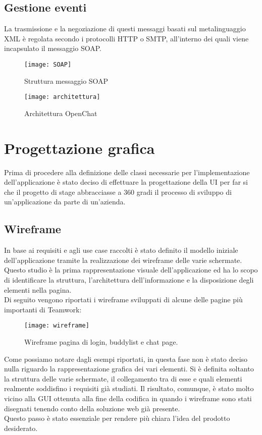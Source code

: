 \subsection{Gestione eventi}
La trasmissione e la negoziazione di questi messaggi  basati sul metalinguaggio XML è regolata secondo i protocolli HTTP o SMTP, all'interno dei quali viene incapsulato il messaggio SOAP.
\begin{figure}[H] 
	\centering
	\texttt{[image: SOAP]}
	\caption{Struttura messaggio SOAP}
\end{figure}

\begin{figure}[H] 
	\centering
	\texttt{[image: architettura]}
	\caption{Architettura OpenChat}
\end{figure}


\section{Progettazione grafica}
Prima di procedere alla definizione delle classi necessarie per l'implementazione 
dell'applicazione è stato deciso di effettuare la progettazione della UI per far 
si che il progetto di stage abbracciasse a 360 gradi il processo di sviluppo di 
un'applicazione da parte di un'azienda.

\subsection{Wireframe}
In base ai requisiti e agli use case raccolti è stato definito il modello iniziale
 dell'applicazione tramite la realizzazione dei wireframe delle varie schermate. \\
Questo studio è la prima rappresentazione visuale dell'applicazione ed ha lo 
scopo di identificare la struttura, l'architettura dell'informazione e la 
disposizione degli elementi nella pagina.\\
Di seguito vengono riportati i wireframe sviluppati di alcune delle pagine più 
importanti di Teamwork:
\begin{figure}[H] 
	\centering
	\texttt{[image: wireframe]}
	\caption{Wireframe pagina di login, buddylist e chat page.}
\end{figure}
Come possiamo notare dagli esempi riportati, in questa fase non è stato deciso 
nulla riguardo la rappresentazione grafica dei vari elementi. 
Si è definita soltanto la struttura delle varie schermate, il collegamento tra 
di esse e quali elementi realmente soddisfino i requisiti già studiati. 
Il risultato, comunque, è stato molto vicino alla GUI ottenuta alla fine della 
codifica in quando i wireframe sono stati disegnati tenendo conto della 
soluzione web già presente.\\ 
Questo passo è stato essenziale per rendere più chiara l'idea del prodotto desiderato.

